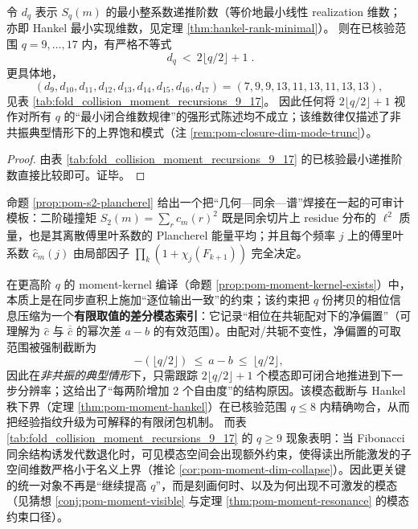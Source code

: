 \begin{corollary}[闭合维数外推在 \texorpdfstring{$q\ge 9$}{q>=9} 处失效（反例族）]\label{cor:pom-moment-dim-collapse}
令 \(d_q\) 表示 \(S_q(m)\) 的最小整系数递推阶数（等价地最小线性 realization 维数；亦即 Hankel 最小实现维数，见定理 \ref{thm:hankel-rank-minimal}）。
则在已核验范围 \(q=9,\dots,17\) 内，有严格不等式
\[
\boxed{\;
d_q\ <\ 2\lfloor q/2\rfloor+1\; }.
\]
更具体地，
\[
(d_9,d_{10},d_{11},d_{12},d_{13},d_{14},d_{15},d_{16},d_{17})=(7,9,9,13,11,13,11,13,13),
\]
见表 \ref{tab:fold_collision_moment_recursions_9_17}。
因此任何将 \(2\lfloor q/2\rfloor+1\) 视作对所有 \(q\) 的“最小闭合维数规律”的强形式陈述均不成立；该维数律仅描述了非共振典型情形下的上界饱和模式（注 \ref{rem:pom-closure-dim-mode-trunc}）。
\end{corollary}
\begin{proof}
由表 \ref{tab:fold_collision_moment_recursions_9_17} 的已核验最小递推阶数直接比较即可。证毕。
\end{proof}

\begin{remark}\label{rem:pom-closure-dim-mode-trunc}
命题 \ref{prop:pom-s2-plancherel} 给出一个把“几何—同余—谱”焊接在一起的可审计模板：二阶碰撞矩
\(
S_2(m)=\sum_r c_m(r)^2
\)
既是同余切片上 residue 分布的 \(\ell^2\) 质量，也是其离散傅里叶系数的 Plancherel 能量平均；并且每个频率 \(j\) 上的傅里叶系数 \(\widehat c_m(j)\) 由局部因子 \(\prod_k(1+\chi_j(F_{k+1}))\) 完全决定。

在更高阶 \(q\) 的 moment-kernel 编译（命题 \ref{prop:pom-moment-kernel-exists}）中，本质上是在同步直积上施加“逐位输出一致”的约束；该约束把 \(q\) 份拷贝的相位信息压缩为一个\textbf{有限取值的差分模态索引}：它记录“相位在共轭配对下的净偏置”（可理解为 \(\widehat c\) 与 \(\overline{\widehat c}\) 的幂次差 \(a-b\) 的有效范围）。由配对/共轭不变性，净偏置的可取范围被强制截断为
\[
-(\lfloor q/2\rfloor)\ \le\ a-b\ \le\ \lfloor q/2\rfloor,
\]
因此在\emph{非共振的典型情形}下，只需跟踪 \(2\lfloor q/2\rfloor+1\) 个模态即可闭合地推进到下一步分辨率；这给出了“每两阶增加 2 个自由度”的结构原因。该模态截断与 Hankel 秩下界（定理 \ref{thm:pom-moment-hankel}）在已核验范围 \(q\le 8\) 内精确吻合，从而把经验指纹升级为可解释的有限闭包机制。
而表 \ref{tab:fold_collision_moment_recursions_9_17} 的 \(q\ge 9\) 现象表明：当 Fibonacci 同余结构诱发代数退化时，可见模态空间会出现额外约束，使得读出所能激发的子空间维数严格小于名义上界（推论 \ref{cor:pom-moment-dim-collapse}）。因此更关键的统一对象不再是“继续提高 \(q\)”，而是刻画何时、以及为何出现不可激发的模态（见猜想 \ref{conj:pom-moment-visible} 与定理 \ref{thm:pom-moment-resonance} 的模态约束口径）。
\end{remark}

